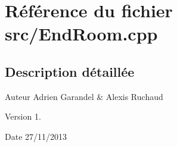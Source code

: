 \section{Référence du fichier src/\-End\-Room.cpp}
\label{_end_room_8cpp}


\subsection{Description détaillée}
\begin{DoxyAuthor}{Auteur}
Adrien Garandel \& Alexis Ruchaud 
\end{DoxyAuthor}
\begin{DoxyVersion}{Version}
1. 
\end{DoxyVersion}
\begin{DoxyDate}{Date}
27/11/2013 
\end{DoxyDate}
